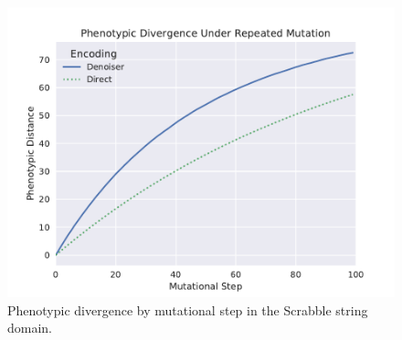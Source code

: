 \begin{figure}
  \includegraphics[width=0.85\linewidth]{img/scrabble_dist_vs_step}
  \caption{
    Phenotypic divergence by mutational step in the Scrabble string domain.
  }\label{fig:scrabble_dist_vs_step}
\end{figure}

